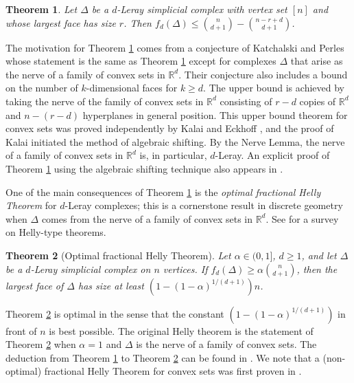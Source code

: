 \documentclass[a4paper, 10pt, reqno, english, ones]{amsart}  %
\newtheorem{theorem}{Theorem}[section]
\theoremstyle{definition}
\theoremstyle{remark}
\begin{document}
\begin{theorem}\label{thm:d-leray-upbound}
    Let $\Delta$ be a $d$-Leray simplicial complex with vertex set $[n]$ and whose largest face has size $r$. Then $f_d(\Delta)\leq {n\choose d+1}-{n-r+d \choose d+1}$.
\end{theorem}

The motivation for Theorem \ref{thm:d-leray-upbound} comes from a conjecture of Katchalski and Perles whose statement is the same as Theorem \ref{thm:d-leray-upbound} except for complexes $\Delta$ that arise as the nerve of a family of convex sets in $\mathbb{R}^d$. Their conjecture also includes a bound on the number of $k$-dimensional faces for $k\geq d$. The upper bound is achieved by taking the nerve of the family of convex sets in $\mathbb{R}^d$ consisting of $r-d$ copies of $\mathbb{R}^d$ and $n-(r-d)$ hyperplanes in general position. This upper bound theorem for convex sets was proved independently by Kalai \cite{kalai1984intersection} and Eckhoff \cite{eckhoff1985Upper}, and the proof of Kalai initiated the method of algebraic shifting. By the Nerve Lemma, the nerve of a family of convex sets in $\mathbb{R}^d$ is, in particular, $d$-Leray. An explicit proof of Theorem \ref{thm:d-leray-upbound} using the algebraic shifting technique also appears in \cite{Bulavka2021Optimal}. 

One of the main consequences of Theorem \ref{thm:d-leray-upbound} is the \textit{optimal fractional Helly Theorem} for $d$-Leray complexes; this is a cornerstone result in discrete geometry when $\Delta$ comes from the nerve of a family of convex sets in $\mathbb{R}^d$. See \cite{amenta2017Helly} for a survey on Helly-type theorems.

\begin{theorem}[Optimal fractional Helly Theorem]\label{thm:frac helly}
    Let $\alpha \in (0,1]$, $d\geq 1$, and let $\Delta$ be a $d$-Leray simplicial complex on $n$ vertices. If $f_d(\Delta)\geq \alpha {n \choose d+1}$, then the largest face of $\Delta$ has size at least $(1-(1-\alpha)^{1/(d+1)})n$.
\end{theorem}

Theorem \ref{thm:frac helly} is optimal in the sense that the constant $(1-(1-\alpha)^{1/(d+1)})$ in front of $n$ is best possible. The original Helly theorem is the statement of Theorem \ref{thm:frac helly} when $\alpha=1$ and $\Delta$ is the nerve of a family of convex sets. The deduction from Theorem \ref{thm:d-leray-upbound} to Theorem \ref{thm:frac helly} can be found in \cite{kalai1984intersection}. We note that a (non-optimal) fractional Helly Theorem for convex sets was first proven in  \cite{katchalski1979Problem}.
\end{document}
